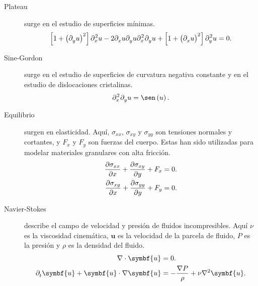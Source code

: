 \begin{description}
	\item[Plateau]
	      surge en el estudio de superficies mínimas.
	      \begin{equation*}
		      \left[
		      1+
		      {\left(\difcp{u}{y}\right)}^{2}
		      \right]
		      \difcp[2]{u}{x}-
		      2\difcp{u}{x}
		      \difcp{u}{y}
		      \difcp[2]{u}{x,y}+
		      \left[
		      1+{\left(\difcp{u}{x}\right)}^{2}
		      \right]
		      \difcp[2]{u}{y}=
		      0.
	      \end{equation*}

	\item[Sine-Gordon]
	      surge en el estudio de superficies de curvatura negativa
	      constante y en el estudio de dislocaciones cristalinas.
	      \begin{equation*}
		      \difcp[2]{u}{x,y}=
		      \sen\left(u\right).
	      \end{equation*}

	\item[Equilibrio]
	      surgen en elasticidad.
	      Aquí, $\sigma_{xx}$, $\sigma_{xy}$ y $\sigma_{yy}$ son
	      tensiones normales y cortantes, y $F_{x}$ y $F_{y}$ son
	      fuerzas del cuerpo.
	      Estas han sido utilizadas para modelar materiales granulares
	      con alta fricción.
	      \begin{align*}
		      \diffp{\sigma_{xx}}{x}+
		      \diffp{\sigma_{xy}}{y}+
		      F_{x} & =
		      0.        \\
		      \diffp{\sigma_{xy}}{x}+
		      \diffp{\sigma_{yy}}{y}+
		      F_{y} & =
		      0.
	      \end{align*}

	\item[Navier-Stokes]
	      describe el campo de velocidad y presión de fluidos
	      incompresibles.
	      Aquí $\nu$ es la viscosidad cinemática, $\symbf{u}$ es la
	      velocidad de la parcela de fluido, $P$ es la presión y $\rho$
	      es la densidad del fluido.
	      \begin{align*}
		      \nabla\cdot\symbf{u}          & =
		      0.                                \\
		      \difcp{\symbf{u}}{t}+
		      \symbf{u}\cdot\nabla\symbf{u} & =
		      -\frac{\nabla P}{\rho}+
		      \nu\nabla^{2}\symbf{u}.
	      \end{align*}
\end{description}

